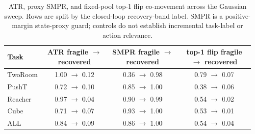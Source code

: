 \begin{table}[H]
\centering
\caption{ATR, proxy SMPR, and fixed-pool top-1 flip co-movement across the Gaussian sweep. Rows are split by the closed-loop recovery-band label. SMPR is a positive-margin state-proxy guard; controls do not establish incremental task-label or action relevance.}
\label{tab:joint-guard-side-validation}
\small
\setlength{\tabcolsep}{4pt}
\begin{tabular}{lccc}
\toprule
Task & ATR fragile $\to$ recovered & SMPR fragile $\to$ recovered & top-1 flip fragile $\to$ recovered \\
\midrule
TwoRoom & 1.00 $\to$ 0.12 & 0.36 $\to$ 0.98 & 0.79 $\to$ 0.07 \\
PushT & 0.72 $\to$ 0.10 & 0.85 $\to$ 1.00 & 0.38 $\to$ 0.06 \\
Reacher & 0.97 $\to$ 0.04 & 0.90 $\to$ 0.99 & 0.54 $\to$ 0.02 \\
Cube & 0.71 $\to$ 0.07 & 0.93 $\to$ 1.00 & 0.53 $\to$ 0.01 \\
ALL & 0.84 $\to$ 0.09 & 0.86 $\to$ 1.00 & 0.54 $\to$ 0.04 \\
\bottomrule
\end{tabular}
\end{table}
